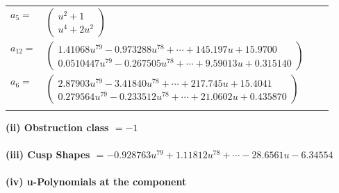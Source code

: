 \documentclass[1p]{elsarticle_modified}
\theoremstyle{definition}
\begin{document}
\begin{tabular}{m{7pt} m{180pt} m{7pt} m{180pt} }
\flushright $a_{5}=$&$\begin{pmatrix}u^2+1\\u^4+2 u^2\end{pmatrix}$ \\
\flushright $a_{12}=$&$\begin{pmatrix}1.41068 u^{79}-0.973288 u^{78}+\cdots+145.197 u+15.9700\\0.0510447 u^{79}-0.267505 u^{78}+\cdots+9.59013 u+0.315140\end{pmatrix}$ \\
\flushright $a_{6}=$&$\begin{pmatrix}2.87903 u^{79}-3.41840 u^{78}+\cdots+217.745 u+15.4041\\0.279564 u^{79}-0.233512 u^{78}+\cdots+21.0602 u+0.435870\end{pmatrix}$\\&\end{tabular}
\flushleft \textbf{(ii) Obstruction class $= -1$}\\~\\
\flushleft \textbf{(iii) Cusp Shapes $= -0.928763 u^{79}+1.11812 u^{78}+\cdots-28.6561 u-6.34554$}\\~\\
\newpage\renewcommand{\arraystretch}{1}
\flushleft \textbf{(iv) u-Polynomials at the component}\newline \\
\end{document}
